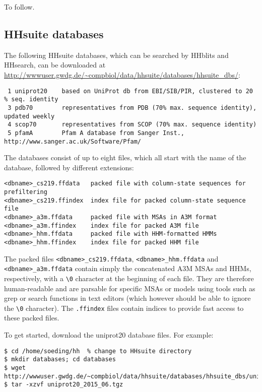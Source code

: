 \documentclass[11pt,a4paper]{article}
\begin{document}
To follow.


\subsection{HHsuite databases} \label{hhblits_dbs}
The following HHsuite databases, which can be searched by HHblits and HHsearch, 
can be downloaded at \url{http://wwwuser.gwdg.de/~compbiol/data/hhsuite/databases/hhsuite_dbs/}: 
\small 
\begin{verbatim}
 1 uniprot20    based on UniProt db from EBI/SIB/PIR, clustered to 20 % seq. identity
 3 pdb70        representatives from PDB (70% max. sequence identity), updated weekly
 4 scop70       representatives from SCOP (70% max. sequence identity)
 5 pfamA        Pfam A database from Sanger Inst., http://www.sanger.ac.uk/Software/Pfam/
\end{verbatim} 
\normalsize

The databases consist of up to eight files, which all start with the name of the database, followed by different extensions:
\begin{verbatim}
<dbname>_cs219.ffdata   packed file with column-state sequences for prefiltering
<dbname>_cs219.ffindex  index file for packed column-state sequence file
<dbname>_a3m.ffdata     packed file with MSAs in A3M format
<dbname>_a3m.ffindex    index file for packed A3M file
<dbname>_hhm.ffdata     packed file with HHM-formatted HMMs
<dbname>_hhm.ffindex    index file for packed HHM file
\end{verbatim}

The packed files \verb`<dbname>_cs219.ffdata`, \verb`<dbname>_hhm.ffdata` and \verb`<dbname>_a3m.ffdata` contain simply the concatenated A3M MSAs and HHMs, respectively, with a \verb`\0` character at the beginning of each file. They are therefore human-readable and are parsable for specific MSAs or models using tools such as grep or search functions in text editors (which however should be able to ignore the \verb`\0` character). The \verb`.ffindex` files contain indices to provide fast access to these packed files.

To get started, download the uniprot20 database files. For example:
\begin{verbatim}
$ cd /home/soeding/hh  % change to HHsuite directory
$ mkdir databases; cd databases
$ wget http://wwwuser.gwdg.de/~compbiol/data/hhsuite/databases/hhsuite_dbs/uniprot20_2015_06.tgz
$ tar -xzvf uniprot20_2015_06.tgz
\end{verbatim}
\end{document}
